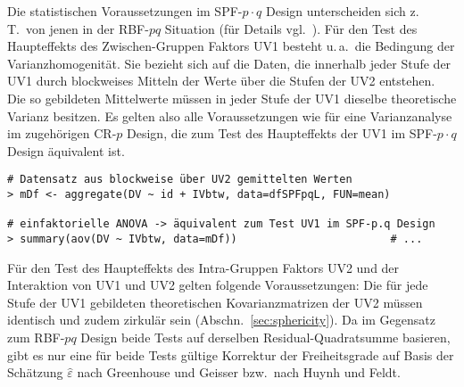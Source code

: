 Die statistischen Voraussetzungen im SPF-$p \cdot q$ Design unterscheiden sich z.\,T.\ von jenen in der RBF-$pq$ Situation (für Details vgl.\ ). Für den Test des Haupteffekts des Zwischen-Gruppen Faktors UV1 besteht u.\,a.\ die Bedingung der Varianzhomogenität. Sie bezieht sich auf die Daten, die innerhalb jeder Stufe der UV1 durch blockweises Mitteln der Werte über die Stufen der UV2 entstehen. Die so gebildeten Mittelwerte müssen in jeder Stufe der UV1 dieselbe theoretische Varianz besitzen. Es gelten also alle Voraussetzungen wie für eine Varianzanalyse im zugehörigen CR-$p$ Design, die zum Test des Haupteffekts der UV1 im SPF-$p \cdot q$ Design äquivalent ist.
\begin{lstlisting}
# Datensatz aus blockweise über UV2 gemittelten Werten
> mDf <- aggregate(DV ~ id + IVbtw, data=dfSPFpqL, FUN=mean)

# einfaktorielle ANOVA -> äquivalent zum Test UV1 im SPF-p.q Design
> summary(aov(DV ~ IVbtw, data=mDf))                        # ...
\end{lstlisting}

Für den Test des Haupteffekts des Intra-Gruppen Faktors UV2 und der Interaktion von UV1 und UV2 gelten folgende Voraussetzungen: Die für jede Stufe der UV1 gebildeten theoretischen Kovarianzmatrizen der UV2 müssen identisch und zudem zirkulär sein (Abschn.\ \ref{sec:sphericity}). Da im Gegensatz zum RBF-$pq$ Design beide Tests auf derselben Residual-Quadratsumme basieren, gibt es nur eine für beide Tests gültige Korrektur der Freiheitsgrade auf Basis der Schätzung $\hat{\varepsilon}$ nach Greenhouse und Geisser bzw.\ nach Huynh und Feldt.

